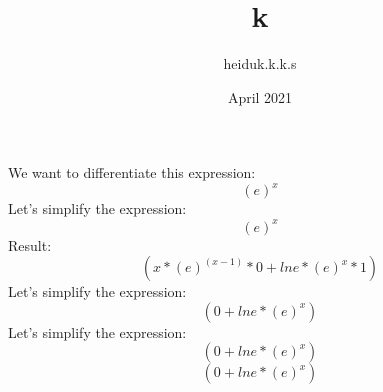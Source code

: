 \documentclass{article}
\title{k}
\author{heiduk.k.k.s }
\date{April 2021}
\begin{document}
\maketitle
\centering
We want to differentiate this expression:
$$ (e)^{x}$$
\centering
Let's simplify the expression:
$$ (e)^{x}$$
\centering
Result:
$$ (x*(e)^{(x-1)}*0+lne*(e)^{x}*1)$$
\centering
Let's simplify the expression:
$$ (0+lne*(e)^{x})$$
\centering
Let's simplify the expression:
$$ (0+lne*(e)^{x})$$
$$ (0+lne*(e)^{x})$$
\end{document}
